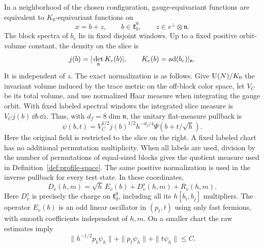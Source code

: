 \begin{lemma}\label{lem:slice}
In a neighborhood of the chosen configuration, gauge-equivariant
functions are equivalent to $K_0$-equivariant functions on
\[
 x=b+z,\qquad b\in\mathfrak k_0^9,
 \qquad z\in e^\perp\otimes\mathfrak n.
\]
The block spectra of $b_e$ lie in fixed disjoint windows. Up to a fixed
positive orbit-volume constant, the density on the slice is
\begin{equation}
 j(b)=|\det_{\mathfrak n}K_e(b)|,
 \qquad K_e(b)=\operatorname{ad}(b_e)|_{\mathfrak n}.
 \label{fast:density}
\end{equation}
It is independent of $z$. The exact normalization is as follows. Give
$\operatorname{U}(N)/K_0$ the invariant volume induced by the trace metric on the
off-block color space, let $V_C$ be its total volume, and use normalized
Haar measure when integrating the gauge orbit. With fixed labeled
spectral windows the integrated slice measure is
$V_Cj(b)\,\dd b\,\dd z$. Thus, with
$d_f=8\dim\mathfrak n$, the unitary flat-measure pullback is
\begin{equation}
 \psi(b,t)=V_C^{1/2}j(b)^{1/2}h^{-d_f/4}
                         \Psi(b+t/\sqrt h).
 \label{fast:unitary-normalization}
\end{equation}
Here the original field is restricted to the slice on the right.
A fixed labeled chart has no additional permutation multiplicity.
When all labels are used, division by the number of permutations of
equal-sized blocks gives the quotient measure used in
Definition~\ref{def:profile-space}. The same positive normalization is
used in the inverse pullback for every test state. In these coordinates,
\begin{equation}
 D_v(h,m)=\sqrt h\,E_v(b)+D_v^s(h,m)+R_v(h,m).
 \label{eq:slice-charge}
\end{equation}
Here $D_v^s$ is precisely the charge on $\mathfrak k_0^9$, including
all its $h[b_i,b_j]$ multipliers. The operator $E_v(b)$ is an odd
linear oscillator in $(p_t,t)$ using only fast fermions, with smooth
coefficients independent of $h,m$. On a smaller chart the raw estimates
imply
\begin{equation}
 \|h^{-1/2}p_b\psi_h\|+\|p_t\psi_h\|+\|t\psi_h\|\leq C.
 \label{fast:chart-raw}
\end{equation}
\end{lemma}

